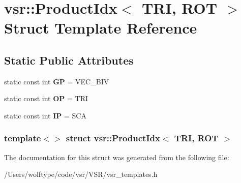 \hypertarget{structvsr_1_1_product_idx_3_01_t_r_i_00_01_r_o_t_01_4}{\section{vsr\-:\-:Product\-Idx$<$ T\-R\-I, R\-O\-T $>$ Struct Template Reference}
\label{structvsr_1_1_product_idx_3_01_t_r_i_00_01_r_o_t_01_4}
}
\subsection*{Static Public Attributes}
\begin{DoxyCompactItemize}
\item 
\hypertarget{structvsr_1_1_product_idx_3_01_t_r_i_00_01_r_o_t_01_4_ad5a019cb10914a22b7915aa5ebd331d1}{static const int {\bfseries G\-P} = V\-E\-C\-\_\-\-B\-I\-V}\label{structvsr_1_1_product_idx_3_01_t_r_i_00_01_r_o_t_01_4_ad5a019cb10914a22b7915aa5ebd331d1}

\item 
\hypertarget{structvsr_1_1_product_idx_3_01_t_r_i_00_01_r_o_t_01_4_a3d82480d6eb1fd9b7cc461f58b44089c}{static const int {\bfseries O\-P} = T\-R\-I}\label{structvsr_1_1_product_idx_3_01_t_r_i_00_01_r_o_t_01_4_a3d82480d6eb1fd9b7cc461f58b44089c}

\item 
\hypertarget{structvsr_1_1_product_idx_3_01_t_r_i_00_01_r_o_t_01_4_a762f24ca2d065bee927199f0a62fcfd3}{static const int {\bfseries I\-P} = S\-C\-A}\label{structvsr_1_1_product_idx_3_01_t_r_i_00_01_r_o_t_01_4_a762f24ca2d065bee927199f0a62fcfd3}

\end{DoxyCompactItemize}
\subsubsection*{template$<$$>$ struct vsr\-::\-Product\-Idx$<$ T\-R\-I, R\-O\-T $>$}



The documentation for this struct was generated from the following file\-:\begin{DoxyCompactItemize}
\item 
/\-Users/wolftype/code/vsr/\-V\-S\-R/vsr\-\_\-templates.\-h\end{DoxyCompactItemize}
